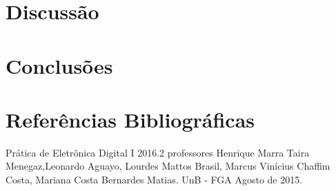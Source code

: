 \documentclass[12pts]{article}
\begin{document}
\section{Discussão}
\iffalse
Discussão sobre os resultados encontrados, comentando detalhadamente as medições realizadas e dando a devida interpretação destas, informando se os objetivos da experimento foram alcançados. Esta é uma das partes mais importantes do relatório: aqui, há oportunidade para expressar os conhecimentos adquiridos na prática e fazer a interrelação com os fundamentos teóricos.
\fi


\section{Conclusões}
\iffalse
Conclusões, mostrando os êxitos e eventuais problemas encontrados na realização do experimento, indicando as limitações, apresentando recomendações e/ou sugestões.
\fi

\section{Referências Bibliográficas}
\iffalse
Referencias Bibliográficas, relacionadas e citadas de acordo com as normas da ABNT.
\fi
Prática de Eletrônica Digital I 2016.2 professores Henrique Marra Taira Menegaz,Leonardo Aguayo, Lourdes Mattos Brasil, Marcus Vinícius Chaffim Costa, Mariana Costa Bernardes Matias. UnB - FGA Agosto de 2015.

\iffalse
\section{Diagramas Esquemáticos}
Diagramas Esquemáticos. Todos os diagramas devem ser inseridos ao final do relatório em páginas separadas do texto, indicando a identificação do circuito, autor, revisor, versão e datas relevantes.
\fi
\newpage
\end{document}
